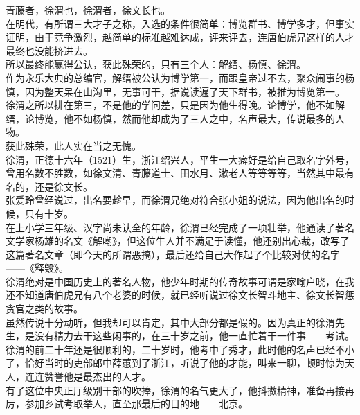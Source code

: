 \begin{multicols}{\theparacolNo}
青藤者，徐渭也，徐渭者，徐文长也。\\

在明代，有所谓三大才子之称，入选的条件很简单：博览群书、博学多才，但事实证明，由于竞争激烈，越简单的标准越难达成，评来评去，连唐伯虎兄这样的人才最终也没能挤进去。\\

所以最终能赢得公认，获此殊荣的，只有三个人：解缙、杨慎、徐渭。\\

作为永乐大典的总编官，解缙被公认为博学第一，而跟皇帝过不去，聚众闹事的杨慎，因为整天呆在山沟里，无事可干，据说读遍了天下群书，被推为博览第一。\\

徐渭之所以排在第三，不是他的学问差，只是因为他生得晚。论博学，他不如解缙，论博览，他不如杨慎，然而他却成为了三人之中，名声最大，传说最多的人物。\\

获此殊荣，此人实在当之无愧。\\

徐渭，正德十六年（1521）生，浙江绍兴人，平生一大癖好是给自己取名字外号，曾用名数不胜数，如徐文清、青藤道士、田水月、漱老人等等等等，当然其中最有名的，还是徐文长。\\

张爱玲曾经说过，出名要趁早，而徐渭兄绝对符合张小姐的说法，因为他出名的时候，只有十岁。\\

在上小学三年级、汉字尚未认全的年龄，徐渭已经完成了一项壮举，他通读了著名文学家杨雄的名文《解嘲》，但这位牛人并不满足于读懂，他还别出心裁，改写了这篇著名文章（即今天的所谓恶搞），最后还给自己大作起了个比较对仗的名字——《释毁》。\\

徐渭绝对是中国历史上的著名人物，他少年时期的传奇故事可谓是家喻户晓，在我还不知道唐伯虎兄有八个老婆的时候，就已经听说过徐文长智斗地主、徐文长智惩贪官之类的故事。\\

虽然传说十分动听，但我却可以肯定，其中大部分都是假的。因为真正的徐渭先生，是没有精力去干这些闲事的，在三十岁之前，他一直忙着干一件事——考试。\\

徐渭的前二十年还是很顺利的，二十岁时，他考中了秀才，此时他的名声已经不小了，恰好当时的吏部郎中薛蕙到了浙江，听说了他的才能，叫来一聊，顿时惊为天人，连连赞誉他是最杰出的人才。\\

有了这位中央正厅级别干部的吹捧，徐渭的名气更大了，他抖擞精神，准备再接再厉，参加乡试考取举人，直至那最后的目的地——北京。\\


\end{multicols}

